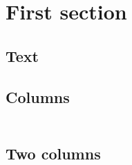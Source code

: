 \documentclass[%
]{phdpresentation}
\begin{document}
\outlineframe%

\section{First section}

\subsection{Text}
\begin{frame}
	\frametitle{\secname}
	\framesubtitle{\subsecname}
	\emph{\blindtextshortshort}\par
	\textbf{\blindtextshortshort}\par
	\textit{\blindtextshortshort}\par
	\textsl{\blindtextshortshort}\par
	\alert{\blindtextshortshort}\par
	\textrm{\blindtextshortshort}\par
	\textsf{\blindtextshortshort}\par
	{\color{ctuGreen}{\blindtextshortshort}}\par
	\structure{\blindtextshortshort}\par
\end{frame}

\subsection{Columns}
\begin{frame}
	\frametitle{\secname}
	\framesubtitle{\subsecname}
	\centering
	\begin{columns}
		\begin{column}{.2\textwidth}
			\blindtextshortshort
		\end{column}
		\begin{column}{.3\textwidth}
			\blindtextshort
		\end{column}
		\begin{column}{.4\textwidth}
			\blindtextshort
		\end{column}
	\end{columns}
\end{frame}

\subsection{Two columns}
\begin{frame}
	\frametitle{\secname}
	\framesubtitle{\subsecname}
	\begin{twocolumns}
		\begin{onecolumn}
			\blindtextshort
		\end{onecolumn}
		\begin{onecolumn}
			\blindtextshort
		\end{onecolumn}
	\end{twocolumns}
\end{frame}
\end{document}

